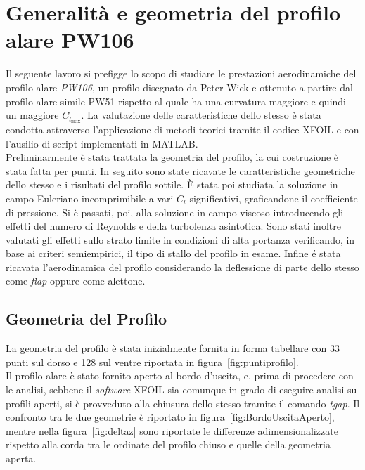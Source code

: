 \chapter{Generalità e geometria del profilo alare PW106}

Il seguente lavoro si prefigge lo scopo di studiare le prestazioni aerodinamiche del profilo alare \emph{PW106}, un profilo disegnato da Peter Wick e ottenuto a partire dal profilo alare simile PW51 rispetto al quale ha una curvatura maggiore e quindi un maggiore $C_{l_\mathrm{max}}$. 
La valutazione delle caratteristiche dello stesso è stata condotta attraverso l'applicazione di metodi teorici tramite il codice XFOIL e con l'ausilio di script implementati in MATLAB.\\
Preliminarmente è stata trattata la geometria del profilo, la cui costruzione è stata fatta per punti. In seguito sono state ricavate le caratteristiche geometriche dello stesso e i risultati del profilo sottile. È stata poi studiata la soluzione in campo Euleriano incomprimibile a vari $C_l$ significativi, graficandone il coefficiente di pressione. Si è passati, poi, alla soluzione in campo viscoso introducendo gli effetti del numero di Reynolds e della turbolenza asintotica. Sono stati inoltre valutati gli effetti sullo strato limite in condizioni di alta portanza verificando, in base ai criteri semiempirici, il tipo di stallo del profilo in esame. Infine é stata ricavata l'aerodinamica del profilo considerando la deflessione di parte dello stesso come {\itshape flap} oppure come alettone.

\section{Geometria del Profilo}

La geometria del profilo è stata inizialmente fornita in forma tabellare con 33 punti sul dorso e 128 sul ventre riportata in figura~\ref{fig:puntiprofilo}. \cite{prof:sito} \\
Il profilo alare è stato fornito aperto al bordo d'uscita, e, prima di procedere con le analisi, sebbene il \emph{software} XFOIL sia comunque in grado di eseguire analisi su profili aperti, si è provveduto alla chiusura dello stesso tramite il comando {\itshape tgap}. Il confronto tra le due geometrie è riportato in figura~\vref{fig:BordoUscitaAperto}, mentre nella figura~\vref{fig:deltaz} sono riportate le differenze adimensionalizzate rispetto  alla corda tra le ordinate del profilo chiuso e quelle della geometria aperta.

